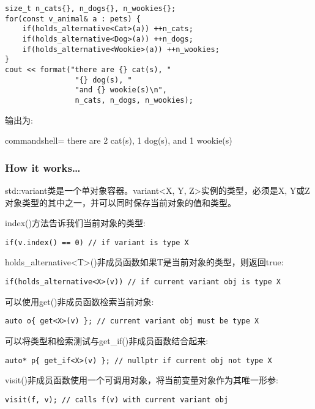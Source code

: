 \begin{itemize}
\begin{lstlisting}[style=styleCXX]
size_t n_cats{}, n_dogs{}, n_wookies{};
for(const v_animal& a : pets) {
	if(holds_alternative<Cat>(a)) ++n_cats;
	if(holds_alternative<Dog>(a)) ++n_dogs;
	if(holds_alternative<Wookie>(a)) ++n_wookies;
}
cout << format("there are {} cat(s), "
				"{} dog(s), "
				"and {} wookie(s)\n",
				n_cats, n_dogs, n_wookies);
\end{lstlisting}

输出为:

\begin{tcblisting}{commandshell={}}
there are 2 cat(s), 1 dog(s), and 1 wookie(s)
\end{tcblisting}
\end{itemize}

\subsubsection{How it works…}

std::variant类是一个单对象容器。variant<X, Y, Z>实例的类型，必须是X, Y或Z对象类型的其中之一，并可以同时保存当前对象的值和类型。

index()方法告诉我们当前对象的类型:

\begin{lstlisting}[style=styleCXX]
if(v.index() == 0) // if variant is type X
\end{lstlisting}

holds\_alternative<T>()非成员函数如果T是当前对象的类型，则返回true:

\begin{lstlisting}[style=styleCXX]
if(holds_alternative<X>(v)) // if current variant obj is type X
\end{lstlisting}

可以使用get()非成员函数检索当前对象:

\begin{lstlisting}[style=styleCXX]
auto o{ get<X>(v) }; // current variant obj must be type X
\end{lstlisting}

可以将类型和检索测试与get\_if()非成员函数结合起来:

\begin{lstlisting}[style=styleCXX]
auto* p{ get_if<X>(v) }; // nullptr if current obj not type X
\end{lstlisting}

visit()非成员函数使用一个可调用对象，将当前变量对象作为其唯一形参:

\begin{lstlisting}[style=styleCXX]
visit(f, v); // calls f(v) with current variant obj
\end{lstlisting}

